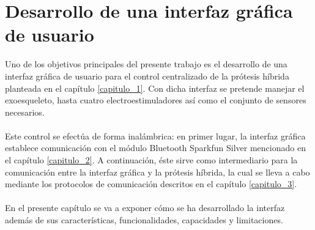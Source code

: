 \chapter{Desarrollo de una interfaz gráfica de usuario}\label{capitulo_4}
Uno de los objetivos principales del presente trabajo es el desarrollo de una interfaz gráfica de usuario para el control centralizado de la prótesis híbrida planteada en el capítulo \ref{capitulo_1}. Con dicha interfaz se pretende manejar el exoesqueleto, hasta cuatro electroestimuladores así como el conjunto de sensores necesarios.
\\
\\
Este control se efectúa de forma inalámbrica: en primer lugar, la interfaz gráfica establece comunicación con el módulo Bluetooth Sparkfun Silver mencionado en el capítulo \ref{capitulo_2}. A continuación, éste sirve como intermediario para la comunicación entre la interfaz gráfica y la prótesis híbrida, la cual se lleva a cabo mediante los protocolos de comunicación descritos en el capítulo \ref{capitulo_3}.
\\
\\
En el presente capítulo se va a exponer cómo se ha desarrollado la interfaz además de sus características, funcionalidades, capacidades y limitaciones.

